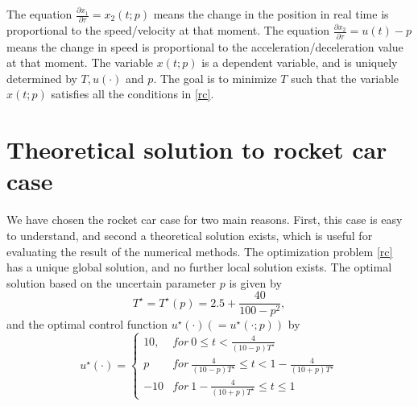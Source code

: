 \documentclass  [
  paper    = a4,
  BCOR     = 10mm,
  twoside,
  fontsize = 12pt,
  fleqn,
  toc      = bibnumbered,
  toc      = listofnumbered,
  numbers  = noendperiod,
  headings = normal,
  listof   = leveldown,
  version  = 3.03
]                                       {scrreprt}
\newcommand{\<}{\langle}
\renewcommand{\>}{\rangle}
\begin{document}
The equation $\frac{\partial x_1}{\partial \tau}= x_2(t;p) $ means the change in the position in real time is proportional to the speed/velocity at that moment. The equation $\frac{\partial x_2}{\partial \tau} = u(t)-p $ means the change in speed is proportional to the acceleration/deceleration value at that moment. 
The variable $x(t;p)$ is a dependent variable, and is uniquely determined by $T, u(\cdot)$ and $p$. The goal is to minimize $T$ such that the variable $x(t;p)$ satisfies all the conditions in \ref{rc}. 

\section{Theoretical solution to rocket car case}
 We have chosen the rocket car case for two main reasons. First, this case is easy to understand, and second a theoretical solution exists, which is useful for evaluating the result of the numerical methods. The optimization problem \ref{rc} has a unique global solution, and no further local solution exists. The optimal solution based on the uncertain parameter $p$ is given by 
\begin{equation}
	T^\star = T^\star(p) = 2.5 + \frac{40}{100-p^2},
	\label{eq_Theory_T}
\end{equation}
and the optimal control function $u^\star(\cdot) (= u^\star(\cdot; p))$ by 
\begin{equation}
	u^\star(\cdot) =     \left\{
	\begin{array}{ll}
		10, & for \  0 \leq t <  \frac{4}{(10-p)T^\star}\\
		p  &  for \ \frac{4}{(10-p)T^\star} \leq t < 1- \frac{4}{(10+p)T^\star} \\
		-10  & for \  1- \frac{4}{(10+p)T^\star} \leq t \leq 1 
	\end{array}
	\right.
	\label{eq_Theory_u}
\end{equation}
\end{document}
